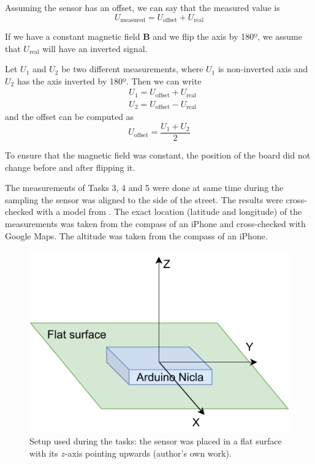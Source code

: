 \documentclass[DIV=14]{scrartcl}
\begin{document}
    Assuming the sensor has an offset, we can say that the measured value is
    \begin{equation}
        U_{\mathrm{measured}} = U_{\mathrm{offset}} + U_{\mathrm{real}}
        \label{eq:measuredValue}
    \end{equation}

    If we have a constant magnetic field $\boldsymbol{B}$ and we flip the axis by 180º, we assume that $U_{\mathrm{real}}$ will
    have an inverted signal.

    Let $U_1$ and $U_2$ be two different measurements, where $U_1$ is non-inverted axis and $U_2$ has the axis inverted by 180º.
    Then we can write
    \begin{subequations}
        \begin{alignat}{1}
            & U_{1} = U_{\mathrm{offset}} + U_{\mathrm{real}}\\
            & U_{2} = U_{\mathrm{offset}} - U_{\mathrm{real}}
        \end{alignat}
    \end{subequations}
    and the offset can be computed as
    \begin{equation}
        U_{\mathrm{offset}} = \frac{U_{1} + U_{2}}{2}
        \label{eq:offset}
    \end{equation}

    To ensure that the magnetic field was constant, the position of the board did not change before and after
    flipping it.

    The measurements of Tasks 3, 4 and 5 were done at same time during the sampling the sensor was aligned to the side of the street.
    The results were cross-checked with a model from \cite{ngdc}.
    The exact location (latitude and longitude) of the measurements was taken from the compass of an iPhone and cross-checked with Google Maps.
    The altitude was taken from the compass of an iPhone.


    \vspace{3em}

    \begin{figure}[h]
        \centering
        \includegraphics[width=.6\textwidth]{figures/Setup1and2}
        \caption{Setup used during the tasks: the sensor was placed in a flat surface with its $z$-axis pointing upwards
            (author's own work).}
        \label{fig:setup}
    \end{figure}
\end{document}
